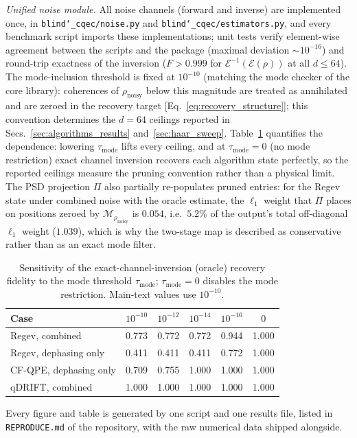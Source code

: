 \documentclass[pra,twocolumn,superscriptaddress,longbibliography,floatfix,nofootinbib]{revtex4-2}
\newcommand{\EE}{\mathcal{E}}
\newcommand{\rhon}{\rho_\mathrm{noisy}}
\begin{document}
\emph{Unified noise module.}
All noise channels (forward and inverse) are implemented once, in \texttt{blind\char`\_cqec/noise.py} and \texttt{blind\char`\_cqec/estimators.py}, and every benchmark script imports these implementations; unit tests verify element-wise agreement between the scripts and the package (maximal deviation $\sim 10^{-16}$) and round-trip exactness of the inversion ($F > 0.999$ for $\EE^{-1}(\EE(\rho))$ at all $d \leq 64$).
The mode-inclusion threshold is fixed at $10^{-10}$ (matching the mode checker of the core library): coherences of $\rhon$ below this magnitude are treated as annihilated and are zeroed in the recovery target [Eq.~\eqref{eq:recovery_structure}]; this convention determines the $d = 64$ ceilings reported in Secs.~\ref{sec:algorithms_results} and~\ref{sec:haar_sweep}.
Table~\ref{tab:tau_sensitivity} quantifies the dependence: lowering $\tau_\mathrm{mode}$ lifts every ceiling, and at $\tau_\mathrm{mode} = 0$ (no mode restriction) exact channel inversion recovers each algorithm state perfectly, so the reported ceilings measure the pruning convention rather than a physical limit.
The PSD projection $\Pi$ also partially re-populates pruned entries: for the Regev state under combined noise with the oracle estimate, the $\ell_1$ weight that $\Pi$ places on positions zeroed by $\mathcal{M}_{\rhon}$ is $0.054$, i.e.\ $5.2\%$ of the output's total off-diagonal $\ell_1$ weight ($1.039$), which is why the two-stage map is described as conservative rather than as an exact mode filter.

\begin{table}[!tb]
\caption{Sensitivity of the exact-channel-inversion (oracle) recovery fidelity to the mode threshold $\tau_\mathrm{mode}$; $\tau_\mathrm{mode} = 0$ disables the mode restriction. Main-text values use $10^{-10}$.}
\label{tab:tau_sensitivity}
\begin{tabular}{lccccc}
Case & $10^{-10}$ & $10^{-12}$ & $10^{-14}$ & $10^{-16}$ & $0$ \\
\hline
Regev, combined            & 0.773 & 0.772 & 0.772 & 0.944 & 1.000 \\
Regev, dephasing only      & 0.411 & 0.411 & 0.411 & 0.772 & 1.000 \\
CF-QPE, dephasing only     & 0.709 & 0.755 & 1.000 & 1.000 & 1.000 \\
qDRIFT, combined           & 1.000 & 1.000 & 1.000 & 1.000 & 1.000 \\
\end{tabular}
\end{table}
Every figure and table is generated by one script and one results file, listed in \texttt{REPRODUCE.md} of the repository, with the raw numerical data shipped alongside.
\end{document}
